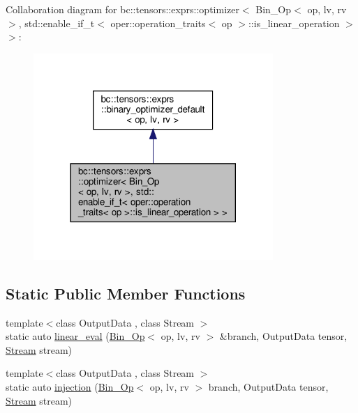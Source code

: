 Collaboration diagram for bc\+:\+:tensors\+:\+:exprs\+:\+:optimizer$<$ Bin\+\_\+\+Op$<$ op, lv, rv $>$, std\+:\+:enable\+\_\+if\+\_\+t$<$ oper\+:\+:operation\+\_\+traits$<$ op $>$\+:\+:is\+\_\+linear\+\_\+operation $>$ $>$\+:\nopagebreak
\begin{figure}[H]
\begin{center}
\leavevmode
\includegraphics[width=257pt]{structbc_1_1tensors_1_1exprs_1_1optimizer_3_01Bin__Op_3_01op_00_01lv_00_01rv_01_4_00_01std_1_1en22c9cef97977a1c8bb173afae2218ce9}
\end{center}
\end{figure}
\subsection*{Static Public Member Functions}
\begin{DoxyCompactItemize}
\item 
{\footnotesize template$<$class Output\+Data , class Stream $>$ }\\static auto \hyperlink{structbc_1_1tensors_1_1exprs_1_1optimizer_3_01Bin__Op_3_01op_00_01lv_00_01rv_01_4_00_01std_1_1en0dcf27d7e2238f62469eab81d847c552_a9dcfb7151668d93b6e56c911da627e0e}{linear\+\_\+eval} (\hyperlink{structbc_1_1tensors_1_1exprs_1_1Bin__Op}{Bin\+\_\+\+Op}$<$ op, lv, rv $>$ \&branch, Output\+Data tensor, \hyperlink{classbc_1_1streams_1_1Stream}{Stream} stream)
\item 
{\footnotesize template$<$class Output\+Data , class Stream $>$ }\\static auto \hyperlink{structbc_1_1tensors_1_1exprs_1_1optimizer_3_01Bin__Op_3_01op_00_01lv_00_01rv_01_4_00_01std_1_1en0dcf27d7e2238f62469eab81d847c552_a7d326a16e88c41338446fa5e5f80f8b1}{injection} (\hyperlink{structbc_1_1tensors_1_1exprs_1_1Bin__Op}{Bin\+\_\+\+Op}$<$ op, lv, rv $>$ branch, Output\+Data tensor, \hyperlink{classbc_1_1streams_1_1Stream}{Stream} stream)
\end{DoxyCompactItemize}
